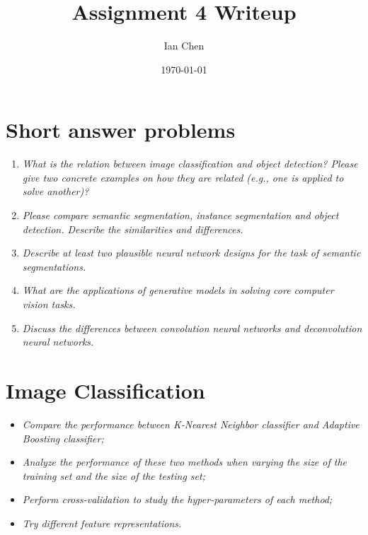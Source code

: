 \documentclass[11pt]{article}
\title{Assignment 4 Writeup}
\author{Ian Chen}
\date{\today}
\begin{document}
    \maketitle


    \section{Short answer problems}

    \begin{enumerate}
        \item \textit{What is the relation between image classification and object detection?
        Please give two concrete examples on how they are related (e.g., one is applied to solve another)?}

        \item \textit{Please compare semantic segmentation, instance segmentation and object detection.
        Describe the similarities and differences.}

        \item \textit{Describe at least two plausible neural network designs for the task of semantic segmentations.}

        \item \textit{What are the applications of generative models in solving core computer vision tasks.}

        \item \textit{Discuss the differences between convolution neural networks and deconvolution neural networks.}
    \end{enumerate}


    \section{Image Classification}

    \begin{itemize}
        \item \textit{Compare the performance between K-Nearest Neighbor classifier and Adaptive Boosting classifier;}

        \item \textit{Analyze the performance of these two methods when varying the size of the training set
        and the size of the testing set;}

        \item \textit{Perform cross-validation to study the hyper-parameters of each method;}

        \item \textit{Try different feature representations.}
    \end{itemize}
\end{document}
